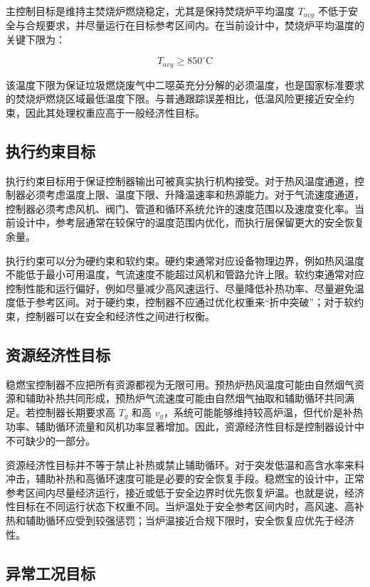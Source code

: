\documentclass[UTF8,openany,zihao=-4,oneside]{ctexbook}
\begin{document}
主控制目标是维持主焚烧炉燃烧稳定，尤其是保持焚烧炉平均温度 \(T_{avg}\) 不低于安全与合规要求，并尽量运行在目标参考区间内。在当前设计中，焚烧炉平均温度的关键下限为：

\[
T_{avg}\geq 850^\circ\mathrm{C}
\]

该温度下限为保证垃圾燃烧废气中二噁英充分分解的必须温度，也是国家标准要求的焚烧炉燃烧区域最低温度下限。与普通跟踪误差相比，低温风险更接近安全约束，因此其处理权重应高于一般经济性目标。

\subsection{执行约束目标}\label{subsec:actuation-constraint-objective}

执行约束目标用于保证控制器输出可被真实执行机构接受。对于热风温度通道，控制器必须考虑温度上限、温度下限、升降温速率和热源能力。对于气流速度通道，控制器必须考虑风机、阀门、管道和循环系统允许的速度范围以及速度变化率。当前设计中，参考层通常在较保守的温度范围内优化，而执行层保留更大的安全恢复余量。

执行约束可以分为硬约束和软约束。硬约束通常对应设备物理边界，例如热风温度不能低于最小可用温度，气流速度不能超过风机和管路允许上限。软约束通常对应控制性能和运行偏好，例如尽量减少高风速运行、尽量降低补热功率、尽量避免温度低于参考区间。对于硬约束，控制器不应通过优化权重来“折中突破”；对于软约束，控制器可以在安全和经济性之间进行权衡。

\subsection{资源经济性目标}\label{subsec:economy-objective}

稳燃宝控制器不应把所有资源都视为无限可用。预热炉热风温度可能由自然烟气资源和辅助补热共同形成，预热炉气流速度可能由自然烟气抽取和辅助循环共同满足。若控制器长期要求高 \(T_g\) 和高 \(v_g\)，系统可能能够维持较高炉温，但代价是补热功率、辅助循环流量和风机功率显著增加。因此，资源经济性目标是控制器设计中不可缺少的一部分。

资源经济性目标并不等于禁止补热或禁止辅助循环。对于突发低温和高含水率来料冲击，辅助补热和高循环速度可能是必要的安全恢复手段。稳燃宝的设计中，正常参考区间内尽量经济运行，接近或低于安全边界时优先恢复炉温。也就是说，经济性目标在不同运行状态下权重不同。当炉温处于安全参考区间内时，高风速、高补热和辅助循环应受到较强惩罚；当炉温接近合规下限时，安全恢复应优先于经济性。

\subsection{异常工况目标}\label{subsec:abnormal-objective}
\end{document}
